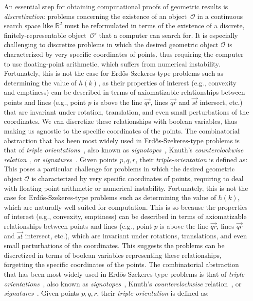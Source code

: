 An essential step for obtaining computational proofs of geometric results is \emph{discretization}:
problems concerning the existence of an object~$\mathcal{O}$ in a continuous search space like $\mathbb{R}^2$
must be reformulated in terms of the existence of a discrete, finitely-representable object~$\mathcal{O}'$
that a computer can search for.
It is especially challenging to discretize problems in which the desired geometric object $\mathcal{O}$ is characterized by very specific coordinates of points,
thus requiring the computer to use floating-point arithmetic,
which suffers from numerical instability.
Fortunately,
this is not the case for Erd\H{o}s-Szekeres-type problems such as determining the value of $h(k)$,
as their properties of interest (e.g., convexity and emptiness)
can be described in terms of axiomatizable relationships between points and lines
(e.g., point $p$ is above the line $\overrightarrow{qr}$, lines $\overrightarrow{qr}$ and $\overrightarrow{st}$ intersect, etc.)
that are invariant under rotation, translation, and even small perturbations of the coordinates.
We can discretize these relationships with boolean variables,
thus making us agnostic to the specific coordinates of the points.
The combinatorial abstraction that has been most widely used in Erd\H{o}s-Szekeres-type problems is that of \emph{triple orientations}~\cite{emptyHexagonNumber, scheucherTwoDisjoint5holes2020},
also known as \emph{signotopes}~\cite{felsnerSweepsArrangementsSignotopes2001,subercaseaux2023minimizing}, 
Knuth's \emph{counterclockwise relation}~\cite{knuthAxiomsHulls1992},
or \emph{signatures}~\cite{szekeres_peters_2006}.
Given points $p, q, r$, their \emph{triple-orientation} is defined as:
\iffalse
This poses a particular challenge for problems in which the desired geometric object $\mathcal{O}$ is characterized by very specific coordinates of points,
requiring to deal with floating point arithmetic or numerical instability.
Fortunately,
this is not the case for Erd\H{o}s-Szekeres-type problems such as determining the value of $h(k)$, 
which are naturally well-suited for computation.
This is so because the properties of interest (e.g., convexity, emptiness) can be described in terms of axiomatizable relationships between points and lines
(e.g., point $p$ is above the line $\overrightarrow{qr}$, lines $\overrightarrow{qr}$ and $\overrightarrow{st}$ intersect, etc.),
which are invariant under rotations, translations, and even small perturbations of the coordinates. 
This suggests the problems can be discretized in terms of boolean variables representing these relationships,
forgetting the specific coordinates of the points.
The combinatorial abstraction that has been most widely used in Erd\H{o}s-Szekeres-type problems is that of \emph{triple orientations}~\cite{emptyHexagonNumber, scheucherTwoDisjoint5holes2020},
also known as \emph{signotopes}~\cite{felsnerSweepsArrangementsSignotopes2001,subercaseaux2023minimizing}, 
Knuth's \emph{counterclockwise} relation~\cite{knuthAxiomsHulls1992},
or \emph{signatures}~\cite{szekeres_peters_2006}.
Given points $p, q, r$, their \emph{triple-orientation} is defined as:


